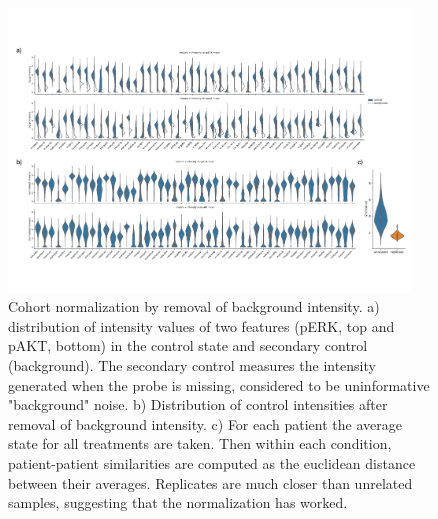 \begin{figure}[h]
  \begin{center}
    \includegraphics[width=0.95\textwidth]{figures/cellot-cohort/supplement/normalization.pdf}
  \end{center}
  \caption{
  Cohort normalization by removal of background intensity.
  a) distribution of intensity values of two features (pERK, top and pAKT, bottom) in the control state and secondary control (background). The secondary control measures the intensity generated when the probe is missing, considered to be uninformative "background" noise.
  b) Distribution of control intensities after removal of background intensity.
  c) For each patient the average state for all treatments are taken. Then within each condition, patient-patient similarities are computed as the euclidean distance between their averages. Replicates are much closer than unrelated samples, suggesting that the normalization has worked.
  }
\label{fig:cellot-cohort-normalization}
\end{figure}

